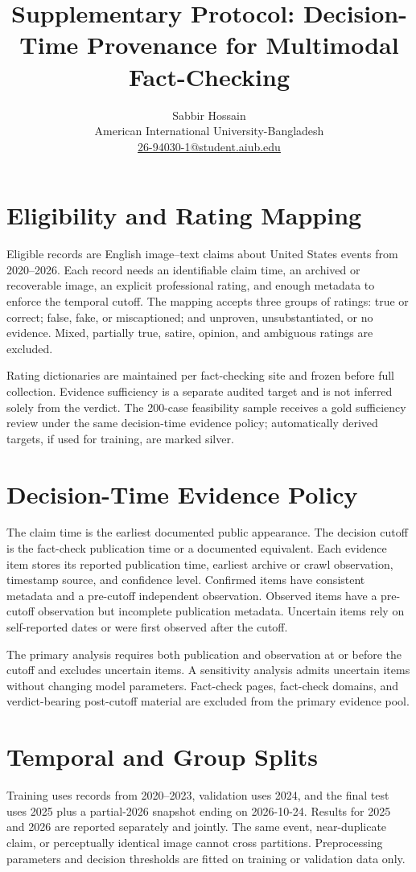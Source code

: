 \documentclass[11pt]{article}
\title{Supplementary Protocol: Decision-Time Provenance for Multimodal Fact-Checking}
\author{Sabbir Hossain\\American International University-Bangladesh\\\href{mailto:26-94030-1@student.aiub.edu}{26-94030-1@student.aiub.edu}}
\date{}
\begin{document}
\maketitle

\section{Eligibility and Rating Mapping}
Eligible records are English image--text claims about United States events from 2020--2026. Each record needs an identifiable claim time, an archived or recoverable image, an explicit professional rating, and enough metadata to enforce the temporal cutoff. The mapping accepts three groups of ratings: true or correct; false, fake, or miscaptioned; and unproven, unsubstantiated, or no evidence. Mixed, partially true, satire, opinion, and ambiguous ratings are excluded.

Rating dictionaries are maintained per fact-checking site and frozen before full collection. Evidence sufficiency is a separate audited target and is not inferred solely from the verdict. The 200-case feasibility sample receives a gold sufficiency review under the same decision-time evidence policy; automatically derived targets, if used for training, are marked silver.

\section{Decision-Time Evidence Policy}
The claim time is the earliest documented public appearance. The decision cutoff is the fact-check publication time or a documented equivalent. Each evidence item stores its reported publication time, earliest archive or crawl observation, timestamp source, and confidence level. Confirmed items have consistent metadata and a pre-cutoff independent observation. Observed items have a pre-cutoff observation but incomplete publication metadata. Uncertain items rely on self-reported dates or were first observed after the cutoff.

The primary analysis requires both publication and observation at or before the cutoff and excludes uncertain items. A sensitivity analysis admits uncertain items without changing model parameters. Fact-check pages, fact-check domains, and verdict-bearing post-cutoff material are excluded from the primary evidence pool.

\section{Temporal and Group Splits}
Training uses records from 2020--2023, validation uses 2024, and the final test uses 2025 plus a partial-2026 snapshot ending on 2026-10-24. Results for 2025 and 2026 are reported separately and jointly. The same event, near-duplicate claim, or perceptually identical image cannot cross partitions. Preprocessing parameters and decision thresholds are fitted on training or validation data only.
\end{document}
